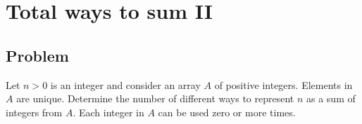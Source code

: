 
\section{Total ways to sum II}



\subsection*{Problem}

Let $n > 0$ is an integer and consider an array $A$ of positive
integers.  Elements in $A$ are unique.  Determine the number of
different ways to represent $n$ as a sum of integers from $A$.  Each
integer in $A$ can be used zero or more times.
